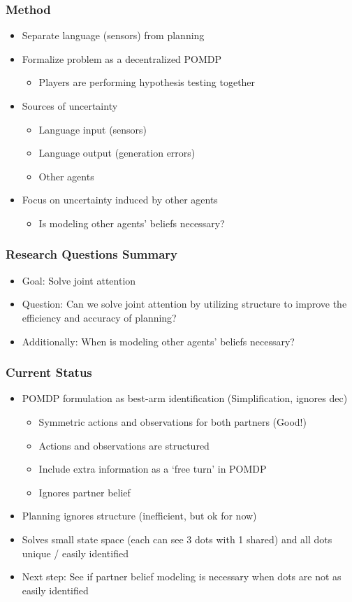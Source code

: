\documentclass{beamer}
\begin{document}
\begin{frame}
\frametitle{Method}
\begin{itemize}
\item Separate language (sensors) from planning
\item Formalize problem as a decentralized POMDP
    \begin{itemize}
    \item Players are performing hypothesis testing together
    \end{itemize}
\item Sources of uncertainty
    \begin{itemize}
    \item Language input (sensors)
    \item Language output (generation errors)
    \item Other agents
    \end{itemize}
\item Focus on uncertainty induced by other agents
    \begin{itemize}
    \item Is modeling other agents' beliefs necessary?
    \end{itemize}
\end{itemize}
\end{frame}

\begin{frame}
\frametitle{Research Questions Summary}
\begin{itemize}
\item Goal: Solve joint attention
\item Question: Can we solve joint attention by utilizing structure to improve the
    efficiency and accuracy of planning?
\item Additionally: When is modeling other agents' beliefs necessary?
\end{itemize}
\end{frame}

\begin{frame}
\frametitle{Current Status}
\begin{itemize}
\item POMDP formulation as best-arm identification (Simplification, ignores dec)
    \begin{itemize}
    \item Symmetric actions and observations for both partners (Good!)
    \item Actions and observations are structured
    \item Include extra information as a `free turn' in POMDP
    \item Ignores partner belief
    \end{itemize}
\item Planning ignores structure (inefficient, but ok for now)
\item Solves small state space (each can see 3 dots with 1 shared) and
    all dots unique / easily identified
\item Next step: See if partner belief modeling is necessary
    when dots are not as easily identified
\end{itemize}
\end{frame}
\end{document}
